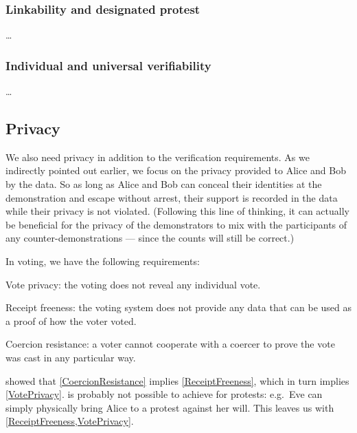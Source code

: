 \subsubsection{Linkability and designated protest}

\dots

\subsubsection{Individual and universal verifiability}

\dots

\subsection{Privacy}%
\label{Privacy}

We also need privacy in addition to the verification requirements.
As we indirectly pointed out earlier, we focus on the privacy provided to Alice 
and Bob by the data.
So as long as Alice and Bob can conceal their identities at the demonstration 
and escape without arrest, their support is recorded in the data while their 
privacy is not violated.
(Following this line of thinking, it can actually be beneficial for the privacy 
of the demonstrators to mix with the participants of any counter-demonstrations 
--- since the counts will still be correct.)

In voting, we have the following requirements:
\begin{frame}
\begin{requirements}[P]
\item\label{VotePrivacy} Vote privacy: the voting does not reveal any 
  individual vote.
\item\label{ReceiptFreeness} Receipt freeness: the voting system does not 
  provide any data that can be used as a proof of how the voter voted.
\item\label{CoercionResistance} Coercion resistance: a voter cannot cooperate 
  with a coercer to prove the vote was cast in any particular way.
\end{requirements}
\pause{}
\end{frame}
\Textcite{VerifyingPrivacyPropertiesOfVotingProtocols} showed that 
\cref{CoercionResistance} implies \cref{ReceiptFreeness}, which in turn implies
\cref{VotePrivacy}.
 is probably not possible to achieve for protests:
e.g.\ Eve can simply physically bring Alice to a protest against her will.
This leaves us with \cref{ReceiptFreeness,VotePrivacy}.

